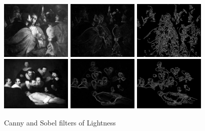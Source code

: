 \documentclass[11pt,a4paper]{report}
\begin{document}
\begin{multicols}{2}
\begin{figure}[tbp]
\centering
\includegraphics[width=0.30\textwidth]{L_caravaggio_1962_139_1}
\includegraphics[width=0.30\textwidth]{sobel_L_caravaggio_1962_139_1}
\includegraphics[width=0.30\textwidth]{canny_L_caravaggio_1962_139_1}
\includegraphics[width=0.30\textwidth]{L_rembrandt_eu_464}
\includegraphics[width=0.30\textwidth]{sobel_L_rembrandt_eu_464}
\includegraphics[width=0.30\textwidth]{canny_L_rembrandt_eu_464}
\caption[Canny and Sobel filters of Ligthness]{Canny and Sobel filters of
Lightness}
\label{figcansobl}
\end{figure}


\end{multicols}
\end{document}
